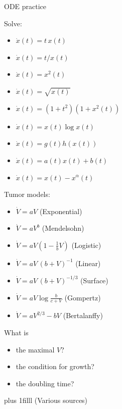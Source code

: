 \documentclass[onepage, 12pt]{beamer}
\def\Bottom#1{\vskip 0pt plus 1filll #1}
\begin{document}
%

\begin{frame}[t]{ODE practice}{}
    \begin{minipage}[t]{0.49\textwidth}
        Solve:
        \begin{itemize}
        \item
            $\dot{x}(t) = t \, x(t)$
        \item
            $\dot{x}(t) = t / x(t)$
        \item
            $\dot{x}(t) = x^2(t)$
        \item  
            $\dot{x}(t) = \sqrt{ x(t) }$
        \item
            $\dot{x}(t) = (1 + t^2) (1 + x^2(t))$
        \item
            $\dot{x}(t) = x(t) \log x(t)$
        \item
            $\dot{x}(t) = g(t) h(x(t))$
        \item
            $\dot{x}(t) = a(t) x(t) + b(t)$
        \item
            $\dot{x}(t) = x(t) - x^\alpha(t)$
        \end{itemize}
    \end{minipage}
    \hfill
    \begin{minipage}[t]{0.49\textwidth}
        Tumor models:
        \begin{itemize}
        \item 
            $\dot{V} = a V$
            \hfill
            {\scriptsize(Exponential)}
        \item
            $\dot{V} = a V^b$
            \hfill
            {\scriptsize(Mendelsohn)}
        \item
            $\dot{V} = a V (1 - \frac1b V)$
            \hfill
            {\scriptsize(Logistic)}
        \item
            $\dot{V} = a V \, (b + V)^{-1}$
            \hfill
            {\scriptsize(Linear)}
        \item
            $\dot{V} = a V \, (b + V)^{-1/3}$
            \hfill
            {\scriptsize(Surface)}
        \item
            $\dot{V} = a V \log \frac{b}{c + V}$
            \hfill
            {\scriptsize(Gompertz)}
        \item
            $\dot{V} = a V^{2/3} - b V$
            \hfill
            {\scriptsize(Bertalanffy)}
        \end{itemize}
        
        What is
        \begin{itemize}
        \item 
            the maximal $V$?
        \item
            the condition for growth?
        \item
            the doubling time?
        \end{itemize}
    \end{minipage}
    
    \Bottom{\footnotesize(Various sources)}
\end{frame}
\end{document}

